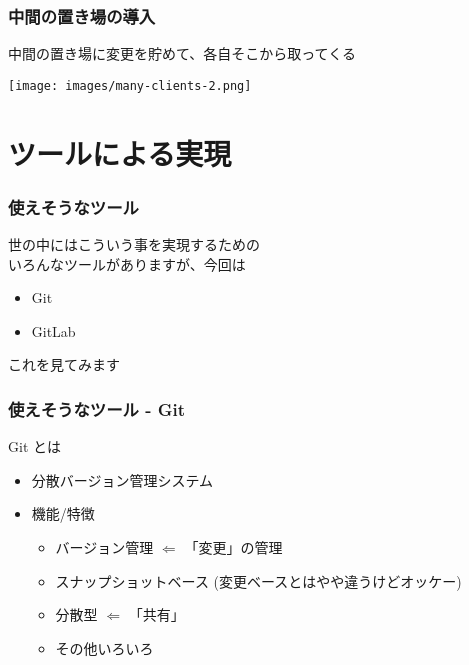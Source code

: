 \documentclass[12pt,dvipdfmx]{beamer}
\begin{document}
\begin{frame}[containsverbatim]
\frametitle{中間の置き場の導入}

\begin{center}
中間の置き場に変更を貯めて、各自そこから取ってくる
\end{center}

\begin{center}
  \texttt{[image: images/many-clients-2.png]}
\end{center}
\end{frame}

\section{ツールによる実現}

\begin{frame}[containsverbatim]
\frametitle{使えそうなツール}

世の中にはこういう事を実現するための\\
いろんなツールがありますが、今回は

\begin{itemize}
\item Git
\item GitLab
\end{itemize}

これを見てみます

\end{frame}

\begin{frame}[containsverbatim]
\frametitle{使えそうなツール - Git}

{\Large Git とは}

\begin{itemize}
\item 分散バージョン管理システム
\item 機能/特徴
  \begin{itemize}
  \item バージョン管理 $\Leftarrow$ 「変更」の管理
  \item スナップショットベース {\scriptsize (変更ベースとはやや違うけどオッケー)}
  \item 分散型 $\Leftarrow$ 「共有」
  \item その他いろいろ
  \end{itemize}
\end{itemize}
\end{frame}
\end{document}

